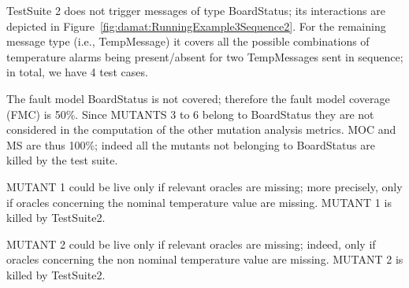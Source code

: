 TestSuite 2 does not trigger messages of type BoardStatus; its interactions are depicted in Figure~\ref{fig:damat:RunningExample3Sequence2}. For the remaining message type (i.e., TempMessage) it covers all the possible combinations of temperature alarms being present/absent for two TempMessages sent in sequence; in total, we have 4 test cases.

The fault model BoardStatus is not covered; therefore the fault model coverage (FMC) is 50\%. Since MUTANTS 3 to 6 belong to BoardStatus they are not considered in the computation of the other mutation analysis metrics. MOC and MS are thus 100\%; indeed all the mutants not belonging to BoardStatus are killed by the test suite.

MUTANT 1 could be live only if relevant oracles are missing; more precisely, only if oracles concerning the nominal temperature value are missing. MUTANT 1 is killed by TestSuite2.

MUTANT 2 could be live only if relevant oracles are missing; indeed, only if oracles concerning the non nominal temperature value are missing. MUTANT 2 is killed by TestSuite2.